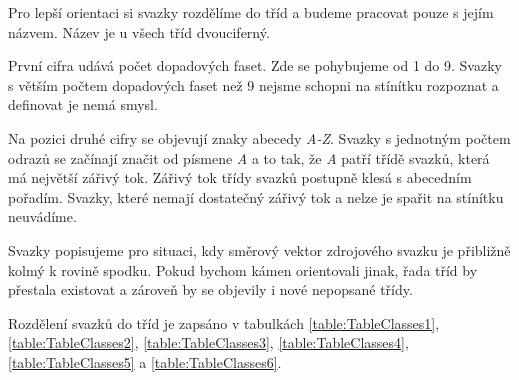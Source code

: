 Pro lepší orientaci si svazky rozdělíme do tříd a budeme pracovat pouze s jejím názvem. Název je u všech tříd dvouciferný.
 
  První cifra udává počet dopadových faset. Zde se pohybujeme od 1 do 9. Svazky s větším počtem dopadových faset než 9 nejsme schopni na stínítku rozpoznat a definovat je nemá smysl. 
  
  Na pozici druhé cifry se objevují znaky abecedy \textit{A-Z}. Svazky s jednotným počtem odrazů se začínají značit od písmene \textit{A} a to tak, že \textit{A} patří třídě svazků, která má největší zářivý tok. Zářivý tok třídy svazků postupně klesá s abecedním pořadím. Svazky, které nemají dostatečný zářivý tok a nelze je spařit na stínítku neuvádíme. 
  
  Svazky popisujeme pro situaci, kdy směrový vektor zdrojového svazku je přibližně kolmý k rovině spodku. Pokud bychom kámen orientovali jinak, řada tříd by přestala existovat a zároveň by se objevily i nové nepopsané třídy. 
  
  Rozdělení svazků do tříd je zapsáno v tabulkách \ref{table:TableClasses1}, \ref{table:TableClasses2}, \ref{table:TableClasses3}, \ref{table:TableClasses4}, \ref{table:TableClasses5} a \ref{table:TableClasses6}.
  
  
 
 
  


